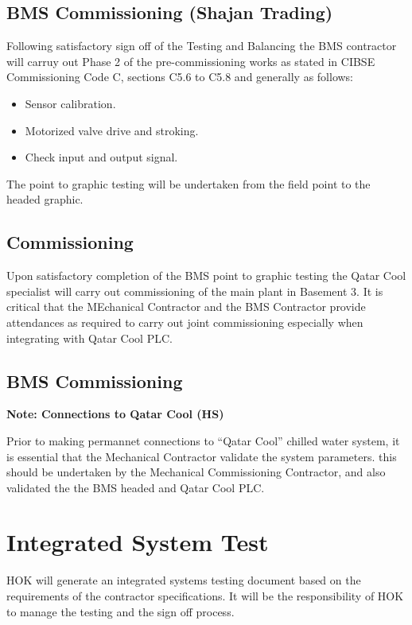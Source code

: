 \section{BMS Commissioning (Shajan Trading)}

Following satisfactory sign off of the Testing and Balancing the BMS contractor will carruy out Phase 2 of the pre-commissioning works as stated in CIBSE Commissioning Code C, sections C5.6 to C5.8 and generally as follows:

\begin{itemize}
\item Sensor calibration.
\item Motorized valve drive and stroking.
\item Check input and output signal.
\end{itemize}

The point to graphic testing will be undertaken from the field point to the headed graphic.

\section{Commissioning}

Upon satisfactory completion of the BMS point to graphic testing the Qatar Cool specialist will carry out commissioning of the main plant in Basement 3. It is critical that the MEchanical Contractor and the BMS Contractor provide attendances as required to carry out joint commissioning especially when integrating with Qatar Cool PLC.

\section{BMS Commissioning}


\textbf{Note: Connections to Qatar Cool (HS)}

Prior to making permannet connections to ``Qatar Cool'' chilled water system, it is essential that the Mechanical Contractor validate the system parameters. this should be undertaken by the Mechanical Commissioning Contractor, and also validated the the BMS headed and Qatar Cool PLC.



\chapter{Integrated System Test}
HOK will generate an integrated systems testing document based on the requirements of the contractor specifications. It will be the responsibility of HOK to manage the testing and the sign off process.


